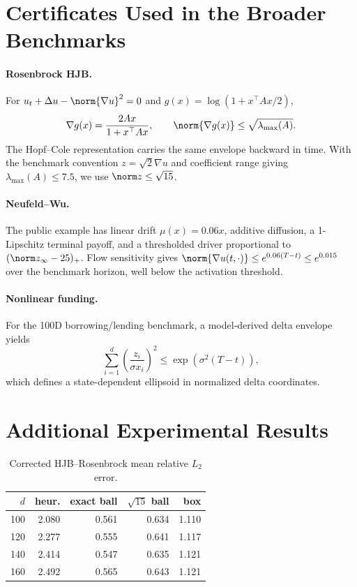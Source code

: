 \section{Certificates Used in the Broader Benchmarks}
\label{app:certificates}
\paragraph{Rosenbrock HJB.}
For $u_t+\Delta u-\norm{\nabla u}^2=0$ and $g(x)=\log(1+x^\top Ax/2)$,
\[
\nabla g(x)=\frac{2Ax}{1+x^\top Ax},\qquad
\norm{\nabla g(x)}\le\sqrt{\lambda_{\max}(A)}.
\]
The Hopf--Cole representation carries the same envelope backward in time. With the benchmark convention $z=\sqrt2\nabla u$ and coefficient range giving $\lambda_{\max}(A)\le7.5$, we use $\norm z\le\sqrt{15}$.

\paragraph{Neufeld--Wu.}
The public example has linear drift $\mu(x)=0.06x$, additive diffusion, a 1-Lipschitz terminal payoff, and a thresholded driver proportional to $(\norm z_\infty-25)_+$. Flow sensitivity gives $\norm{\nabla u(t,\cdot)}\le e^{0.06(T-t)}\le e^{0.015}$ over the benchmark horizon, well below the activation threshold.

\paragraph{Nonlinear funding.}
For the 100D borrowing/lending benchmark, a model-derived delta envelope yields
\[
\sum_{i=1}^d\left(\frac{z_i}{\sigma x_i}\right)^2
\le \exp(\sigma^2(T-t)),
\]
which defines a state-dependent ellipsoid in normalized delta coordinates.

\section{Additional Experimental Results}
\begin{table}[h]
\caption{Corrected HJB--Rosenbrock mean relative $L_2$ error.}
\centering\small
\begin{tabular}{rrrrr}
\toprule
$d$&heur.&exact ball&$\sqrt{15}$ ball&box\\
\midrule
100&2.080&0.561&0.634&1.110\\
120&2.277&0.555&0.641&1.117\\
140&2.414&0.547&0.635&1.121\\
160&2.492&0.565&0.643&1.121\\
\bottomrule
\end{tabular}
\end{table}

